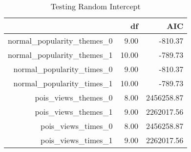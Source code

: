 
\begin{table}[ht]
	   \caption{Testing Random Intercept} 
	\label{aic}
\centering
\begin{tabular}{rrr}
  \hline
 & df & AIC \\ 
  \hline
normal\_popularity\_themes\_0 & 9.00 & -810.37 \\ 
  normal\_popularity\_themes\_1 & 10.00 & -789.73 \\ 
normal\_popularity\_times\_0 & 9.00 & -810.37 \\ 
  normal\_popularity\_times\_1 & 10.00 & -789.73 \\ 
pois\_views\_themes\_0 & 8.00 & 2456258.87 \\ 
  pois\_views\_themes\_1 & 9.00 & 2262017.56 \\ 
pois\_views\_times\_0 & 8.00 & 2456258.87 \\ 
  pois\_views\_times\_1 & 9.00 & 2262017.56 \\ 
   \hline
\end{tabular}
\end{table}
